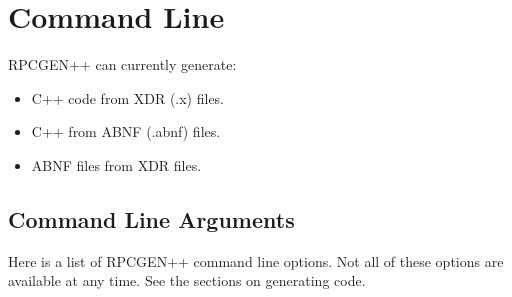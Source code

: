 \section{Command Line}
RPCGEN++ can currently generate:
\begin{itemize}
\item C++ code from XDR (.x) files.
\item C++ from ABNF (.abnf) files.
\item ABNF files from XDR files.
\end{itemize}

\subsection{Command Line Arguments}
Here is a list of RPCGEN++ command line options.
Not all of these options are available at any time.
See the sections on generating code.

